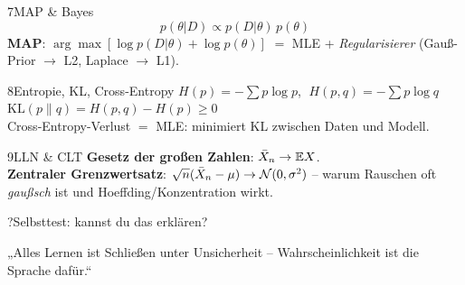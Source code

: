 \begin{hngrid}
\begin{hnp}[raster multicolumn=2,acc=hnpurple]{7}{MAP \& Bayes}
\[ p(\theta|D)\propto p(D|\theta)\,p(\theta) \]
\textbf{MAP}: $\arg\max[\log p(D|\theta)+\log p(\theta)]$ $=$ MLE + \emph{Regularisierer} (Gauß-Prior $\to$ L2, Laplace $\to$ L1).
\end{hnp}
%
\begin{hnp}[raster multicolumn=2,acc=hnorange]{8}{Entropie, KL, Cross-Entropy}
$H(p)=-\sum p\log p$, $\;H(p,q)=-\sum p\log q$\\
$\mathrm{KL}(p\|q)=H(p,q)-H(p)\ge0$\\
Cross-Entropy-Verlust $=$ MLE: minimiert KL zwischen Daten und Modell.
\end{hnp}
%
\begin{hnp}[raster multicolumn=2,acc=hnteal]{9}{LLN \& CLT}
\textbf{Gesetz der großen Zahlen}: $\bar X_n\to\mathbb{E} X$.\\
\textbf{Zentraler Grenzwertsatz}: $\sqrt n(\bar X_n-\mu)\to\mathcal{N}(0,\sigma^2)$ -- warum Rauschen oft \emph{gaußsch} ist und Hoeffding/Konzentration wirkt.
\end{hnp}
%
\begin{hnp}[raster multicolumn=6,acc=hnpurple,colback=hnlilac!30]{?}{Selbsttest: kannst du das erklären?}
\end{hnp}
%
\begin{hnbanner}[raster multicolumn=6]
„Alles Lernen ist Schließen unter Unsicherheit -- Wahrscheinlichkeit ist die Sprache dafür.“
\end{hnbanner}
\end{hngrid}
